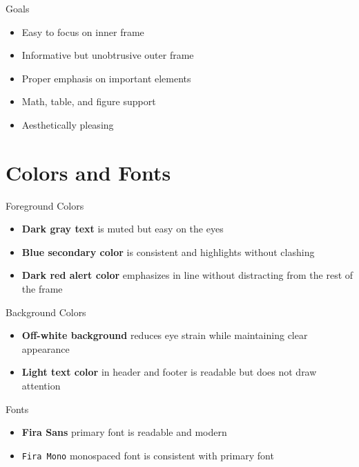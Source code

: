 \documentclass{beamer}
\begin{document}
\begin{frame}{Goals}
	\begin{itemize}
		\item Easy to focus on inner frame
		\item Informative but unobtrusive outer frame
		\item Proper emphasis on important elements
		\item Math, table, and figure support
		\item Aesthetically pleasing
	\end{itemize}
\end{frame}

\section{Colors and Fonts}

\sectionpage

\begin{frame}{Foreground Colors}
	\begin{itemize}
		\item \textbf{Dark gray text} is muted but easy on the eyes
		\item \textbf{Blue secondary color} is consistent and highlights without clashing
		\item \textbf{Dark red \alert{alert} color} emphasizes in line without distracting from the rest of the frame
	\end{itemize}
\end{frame}

\begin{frame}{Background Colors}
	\begin{itemize}
		\item \textbf{Off-white background} reduces eye strain while maintaining clear appearance
		\item \textbf{Light text color} in header and footer is readable but does not draw attention
	\end{itemize}
\end{frame}

\begin{frame}{Fonts}
	\begin{itemize}
		\item \textbf{Fira Sans} primary font is readable and modern
		\item \texttt{Fira Mono} monospaced font is consistent with primary font
	\end{itemize}
\end{frame}
\end{document}
